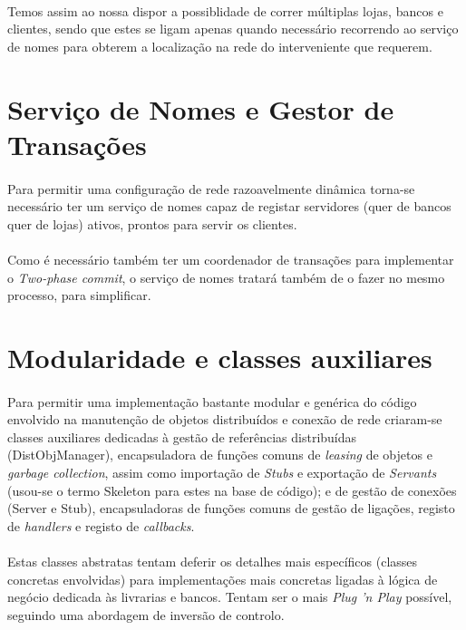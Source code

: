 \documentclass[11pt,a4paper]{report}
\begin{document}
\paragraph{}Temos assim ao nossa dispor a possiblidade de correr múltiplas lojas, bancos e clientes, sendo que estes se ligam apenas quando necessário recorrendo ao serviço de nomes para obterem a localização na rede do interveniente que requerem.

\section{Serviço de Nomes e Gestor de Transações}

\paragraph{}Para permitir uma configuração de rede razoavelmente dinâmica torna-se necessário ter um serviço de nomes capaz de registar servidores (quer de bancos quer de lojas) ativos, prontos para servir os clientes.

\paragraph{}Como é necessário também ter um coordenador de transações para implementar o \textit{Two-phase commit}, o serviço de nomes tratará também de o fazer no mesmo processo, para simplificar.

\section{Modularidade e classes auxiliares}

\paragraph{} Para permitir uma implementação bastante modular e genérica do código envolvido na manutenção de objetos distribuídos e conexão de rede criaram-se classes auxiliares dedicadas à gestão de referências distribuídas (DistObjManager), encapsuladora de funções comuns de \textit{leasing} de objetos e \textit{garbage collection}, assim como importação de \textit{Stubs
} e exportação de \textit{Servants} (usou-se o termo Skeleton para estes na base de código); e de gestão de conexões (Server e Stub), encapsuladoras de funções comuns de gestão de ligações, registo de \textit{handlers} e registo de \textit{callbacks}.

\paragraph{} Estas classes abstratas tentam deferir os detalhes mais específicos (classes concretas envolvidas) para implementações mais concretas ligadas à lógica de negócio dedicada às livrarias e bancos. Tentam ser o mais \textit{Plug 'n Play} possível, seguindo uma abordagem de inversão de controlo.
\end{document}
